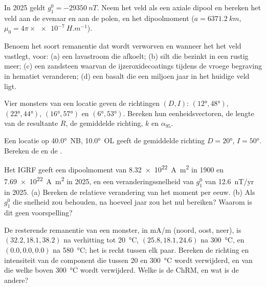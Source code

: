 \begin{exercise}[$\star$]\label{exo:b3:palaeomagnetism:3}
In 2025 geldt $g_1^0 = \qty{-29350}{nT}$. Neem het veld als een axiale dipool en
bereken het veld aan de evenaar en aan de polen, en het dipoolmoment
($a = \qty{6371.2}{km}$, $\mu_0 = 4\pi\times\qty{e-7}{H.m^{-1}}$).
\end{exercise}

\begin{exercise}[$\star$]\label{exo:b3:palaeomagnetism:4}
Benoem het soort remanentie dat wordt verworven en wanneer het het veld vastlegt, voor: (a) een lavastroom
die afkoelt; (b) silt die bezinkt in een rustig meer; (c) een zandsteen waarvan de
ijzeroxidecoatings tijdens de vroege begraving in hematiet veranderen; (d) een basalt
die een miljoen jaar in het huidige veld ligt.
\end{exercise}

\begin{exercise}[$\star\star$]\label{exo:b3:palaeomagnetism:5}
Vier monsters van een locatie geven de richtingen $(D, I)$: $(\ang{12}, \ang{48})$,
$(\ang{22}, \ang{44})$, $(\ang{16}, \ang{57})$ en $(\ang{6}, \ang{53})$.
Bereken hun eenheidsvectoren, de lengte van de resultante $R$, de gemiddelde richting, $k$
en $\alpha_{95}$.
\end{exercise}

\begin{exercise}[$\star\star$]\label{exo:b3:palaeomagnetism:6}
Een locatie op \ang{40.0}~NB, \ang{10.0}~OL geeft de gemiddelde richting $D = \ang{20}$,
$I = \ang{50}$. Bereken de  en de .
\end{exercise}

\begin{exercise}[$\star\star$]\label{exo:b3:palaeomagnetism:7}
Het IGRF geeft een dipoolmoment van \qty{8.32e22}{A.m^2} in 1900 en
\qty{7.69e22}{A.m^2} in 2025, en een veranderingssnelheid van $g_1^0$ van
\qty{+12.6}{nT/yr} in 2025. (a) Bereken de relatieve verandering van het moment per
eeuw. (b) Als $g_1^0$ die snelheid zou behouden, na hoeveel jaar zou het nul bereiken?
Waarom is dit geen voorspelling?
\end{exercise}

\begin{exercise}[$\star\star$]\label{exo:b3:palaeomagnetism:8}
De resterende remanentie van een monster, in \unit{mA/m} (noord, oost, neer), is
$(32.2, 18.1, 38.2)$ na verhitting tot \qty{20}{\celsius}, $(25.8, 18.1, 24.6)$
na \qty{300}{\celsius}, en $(0.0, 0.0, 0.0)$ na \qty{580}{\celsius}; het
 is recht tussen elk paar. Bereken de richting en intensiteit van de component die
tussen 20 en \qty{300}{\celsius} wordt verwijderd, en van die welke boven
\qty{300}{\celsius} wordt verwijderd. Welke is de ChRM, en wat is de
andere?
\end{exercise}

